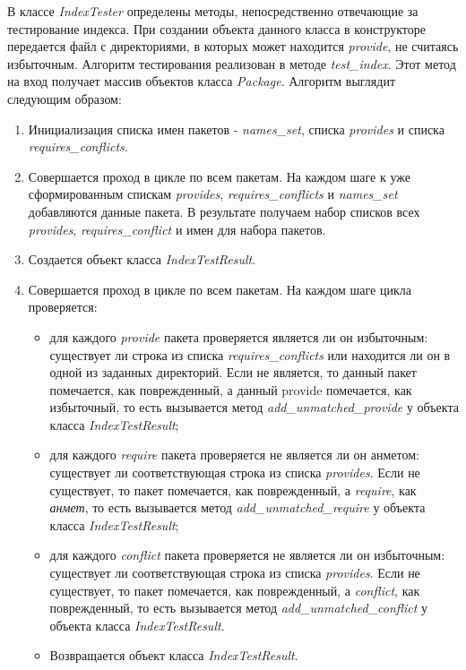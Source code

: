 В классе \textit{IndexTester} определены методы, непосредственно отвечающие за тестирование
индекса. При создании объекта данного класса в конструкторе передается файл с директориями,
в которых может находится \textit{provide}, не считаясь избыточным. 
Алгоритм тестирования реализован в методе \textit{test\_index}. Этот метод на вход
получает массив объектов класса \textit{Package}. Алгоритм выглядит следующим образом:
\begin{enumerate}
\item{Инициализация списка имен пакетов - \textit{names\_set}, списка \textit{provides} и 
списка \textit{requires\_conflicts}.}
\item{Совершается проход в цикле по всем пакетам. На каждом шаге 
к уже сформированным спискам \textit{provides}, \textit{requires\_conflicts} и \textit{names\_set} 
добавляются данные пакета. В результате получаем набор списков всех \textit{provides}, 
\textit{requires\_conflict} и имен для набора пакетов.}
\item{Создается объект класса \textit{IndexTestResult}.}
\item{Совершается проход в цикле по всем пакетам. На каждом шаге цикла проверяется:}

\begin{itemize}
\item{для каждого \textit{provide} пакета проверяется является ли он избыточным: существует ли
строка из списка \textit{requires\_conflicts} или находится ли он в одной из заданных директорий.
Если не является, то данный пакет помечается, как поврежденный, а данный provide помечается,
как избыточный, то есть вызывается метод \emph{add\_unmatched\_provide} у объекта класса \textit{IndexTestResult};}
\item{для каждого \textit{require} пакета проверяется не является ли он анметом: существует ли
соответствующая строка из списка \textit{provides}. Если не существует, то пакет помечается, как 
поврежденный, а \textit{require}, как \textit{анмет}, то есть вызывается метод \textit{add\_unmatched\_require}
у объекта класса \textit{IndexTestResult};}
\item{для каждого \textit{conflict} пакета проверяется не является ли он избыточным: существует ли
соответствующая строка из списка \textit{provides}. Если не существует, то пакет помечается, как 
поврежденный, а \textit{conflict}, как поврежденный, то есть вызывается метод \textit{add\_unmatched\_conflict}
у объекта класса \textit{IndexTestResult}.}

\item{Возвращается объект класса \textit{IndexTestResult}.}
\end{itemize}
\end{enumerate}
